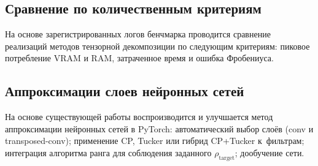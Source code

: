 \subsection*{Сравнение по количественным критериям}
На основе зарегистрированных логов бенчмарка проводится сравнение реализаций методов тензорной декомпозиции по следующим критериям: пиковое потребление VRAM и RAM, затраченное время и ошибка Фробениуса.

\subsection*{Аппроксимации слоев нейронных сетей}
На основе существующей работы воспроизводится и улучшается метод аппроксимации нейронных сетей в PyTorch: автоматический выбор слоёв (conv и transposed-conv); применение CP, Tucker или гибрид CP+Tucker к~фильтрам; интеграция алгоритма ранга для соблюдения заданного $\rho_{\text{target}}$; дообучение сети.